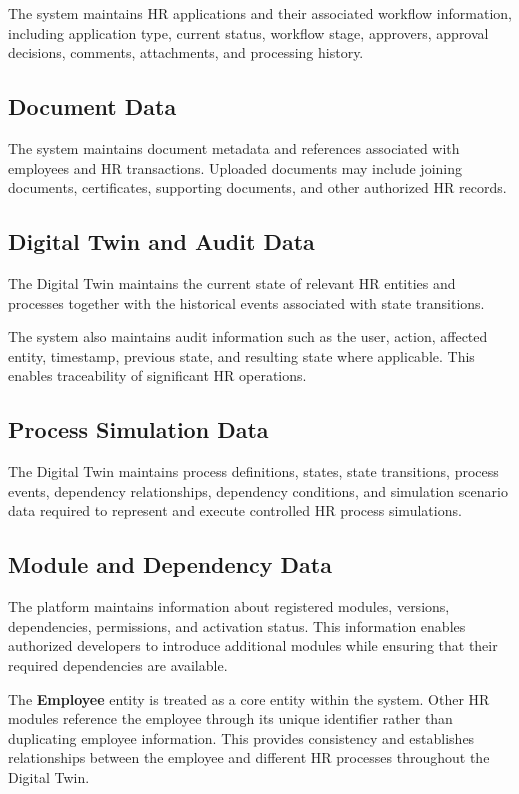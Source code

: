 \documentclass[12pt,a4paper]{article}
\begin{document}
The system maintains HR applications and their associated workflow
information, including application type, current status, workflow
stage, approvers, approval decisions, comments, attachments, and
processing history.

\subsection{Document Data}

The system maintains document metadata and references associated
with employees and HR transactions. Uploaded documents may include
joining documents, certificates, supporting documents, and other
authorized HR records.

\subsection{Digital Twin and Audit Data}

The Digital Twin maintains the current state of relevant HR
entities and processes together with the historical events
associated with state transitions.

The system also maintains audit information such as the user,
action, affected entity, timestamp, previous state, and resulting
state where applicable. This enables traceability of significant
HR operations.

\subsection{Process Simulation Data}

The Digital Twin maintains process definitions, states, state
transitions, process events, dependency relationships, dependency
conditions, and simulation scenario data required to represent and
execute controlled HR process simulations.

\subsection{Module and Dependency Data}

The platform maintains information about registered modules,
versions, dependencies, permissions, and activation status. This
information enables authorized developers to introduce additional
modules while ensuring that their required dependencies are
available.

The \textbf{Employee} entity is treated as a core entity within the
system. Other HR modules reference the employee through its unique
identifier rather than duplicating employee information. This
provides consistency and establishes relationships between the
employee and different HR processes throughout the Digital Twin.
\end{document}
